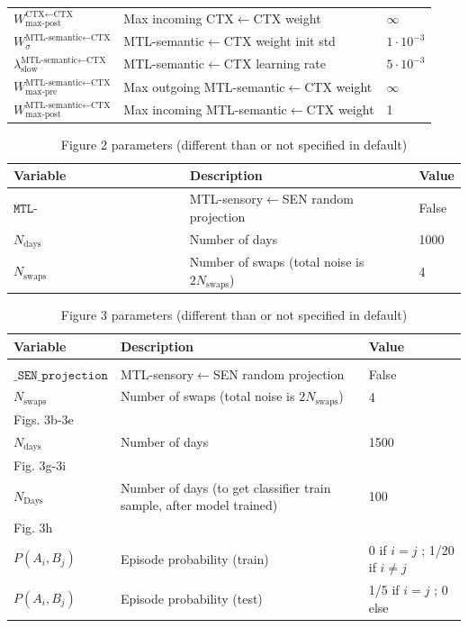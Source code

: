 \documentclass{article}
\begin{document}
\begin{table}[ht]
\begin{tabular}{lp{6cm}l}
$W^{\text{CTX}\leftarrow\text{CTX}}_{\text{max-post}}$ & Max incoming CTX$\leftarrow$CTX weight & $\infty$ \\
$W_\sigma^{\text{MTL-semantic}\leftarrow\text{CTX}}$ & MTL-semantic$\leftarrow$CTX weight init std & $1\cdot 10^{-3}$ \\
$\lambda^{\text{MTL-semantic}\leftarrow\text{CTX}}_{\textrm{slow}}$ & MTL-semantic$\leftarrow$CTX learning rate & $5\cdot 10^{-3}$ \\
$W^{\text{MTL-semantic}\leftarrow\text{CTX}}_{\text{max-pre}}$ & Max outgoing MTL-semantic$\leftarrow$CTX weight & $\infty$ \\
$W^{\text{MTL-semantic}\leftarrow\text{CTX}}_{\text{max-post}}$ & Max incoming MTL-semantic$\leftarrow$CTX weight & 1 \\
\bottomrule
\end{tabular}
\end{table}
\begin{table}[ht]
\centering
\caption{Figure 2 parameters (different than or not specified in default)}
\label{tab:figure_2}
\begin{tabular}{lll}
\toprule
\textbf{Variable} & \textbf{Description} & \textbf{Value} \\
\midrule
$\texttt{MTL-sensory\_SEN\_projection}$ & MTL-sensory$\leftarrow$SEN random projection & False \\
$N_\textrm{days}$ & Number of days & 1000 \\
$N_\textrm{swaps}$ & Number of swaps (total noise is $2N_\textrm{swaps}$) & 4 \\
\bottomrule
\end{tabular}
\end{table}

\begin{table}[ht]
\centering
\caption{Figure 3 parameters (different than or not specified in default)}
\label{tab:figure_3}
\begin{tabular}{lll}
\toprule
\textbf{Variable} & \textbf{Description} & \textbf{Value} \\
\midrule
\makecell{$\texttt{MTL-sensory}$\\$\texttt{\_SEN\_projection}$} & MTL-sensory$\leftarrow$SEN random projection & False \\
$N_\textrm{swaps}$ & Number of swaps (total noise is $2N_\textrm{swaps}$) & 4 \\
\midrule
Figs. 3b-3e & & \\
$N_\textrm{days}$ & Number of days & 1500 \\
\midrule
Fig. 3g-3i & & \\
$N_\textrm{Days}$ & Number of days (to get classifier train sample, after model trained) & 100 \\
\midrule
Fig. 3h & & \\
$P(A_i, B_j)$ & Episode probability (train) & 0 if $i=j$ ; 1/20 if $i\neq j$ \\
$P(A_i, B_j)$ & Episode probability (test) & 1/5 if $i=j$ ; 0 else \\
\bottomrule
\end{tabular}
\end{table}
\end{document}
